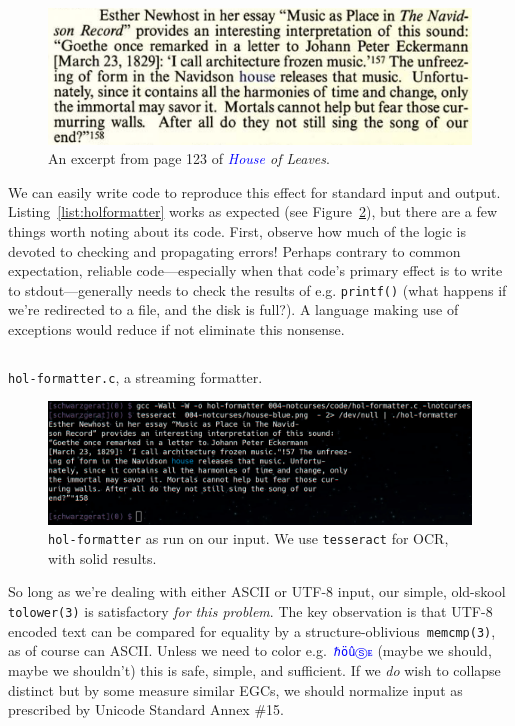 \documentclass[letterpaper,10pt]{article}
\begin{document}
\begin{figure}[!htb]
\centering \includegraphics[width=.5\linewidth]{house-blue.png}
\caption{An excerpt from page 123 of \textit{\textcolor{blue}{House} of Leaves}.}
\label{fig:houseofleaves}
\end{figure}

We can easily write code to reproduce this effect for standard input and output.
Listing~\ref{list:holformatter} works as expected (see
Figure~\ref{fig:houseout}), but there are a few things worth noting about its
code. First, observe how much of the logic is devoted to checking and
propagating errors! Perhaps contrary to common expectation, reliable
code---especially when that code's primary effect is to write to
stdout---generally needs to check the results of e.g. \texttt{printf()} (what
happens if we're redirected to a file, and the disk is full?). A language
making use of exceptions would reduce if not eliminate this nonsense.

\begin{listing}[!htb]
\inputminted[]{C}{code/hol-formatter.c}
\caption{\texttt{hol-formatter.c}, a streaming formatter.}
\label{list:holformatter}
\end{listing}

\begin{figure}[!htb]
\centering \includegraphics[width=.75\linewidth]{hol-formatted.png}
\caption[\texttt{hol-formatter} as run on OCRd input.]{\texttt{hol-formatter} as run on our input. We use \texttt{tesseract} for OCR, with solid results.}
\label{fig:houseout}
\end{figure}

So long as we're dealing with either ASCII or UTF-8 input, our simple, old-skool
\texttt{tolower(3)} is satisfactory \textit{for this problem}. The key
observation is that UTF-8 encoded text can be compared for equality by
a structure-oblivious~\texttt{memcmp(3)}, as of course can ASCII.
Unless we need to color e.g.~\textcolor{blue}{\texttt{ℏöûⓈᴇ}} (maybe we should,
maybe we shouldn't) this is safe, simple, and sufficient. If we \textit{do}
wish to collapse distinct but by some measure similar EGCs, we should normalize
input as prescribed by Unicode Standard Annex \#15\cite{annex15}.
\end{document}
